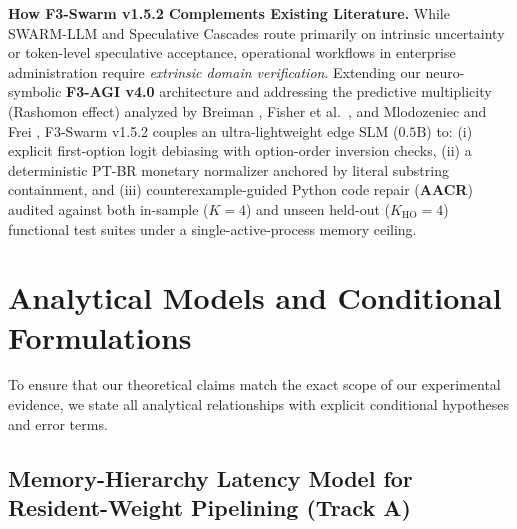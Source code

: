 \documentclass[10pt,a4paper]{article}
\begin{document}
\textbf{How F3-Swarm v1.5.2 Complements Existing Literature.}
While SWARM-LLM \cite{dahshan2026swarmllm} and Speculative Cascades \cite{narasimhan2024cascades} route primarily on intrinsic uncertainty or token-level speculative acceptance, operational workflows in enterprise administration require \emph{extrinsic domain verification}. Extending our neuro-symbolic \textbf{F3-AGI v4.0} architecture \cite{oliveira2026f3agi} and addressing the predictive multiplicity (Rashomon effect) analyzed by Breiman \cite{breiman2001statistical}, Fisher et al.\ \cite{fisher2019rashomon}, and Mlodozeniec and Frei \cite{mlodozeniec2026rashomon}, F3-Swarm v1.5.2 couples an ultra-lightweight edge SLM ($0.5\text{B}$) to: (i) explicit first-option logit debiasing with option-order inversion checks, (ii) a deterministic PT-BR monetary normalizer anchored by literal substring containment, and (iii) counterexample-guided Python code repair (\textbf{AACR}) audited against both in-sample ($K=4$) and unseen held-out ($K_{\text{HO}}=4$) functional test suites under a single-active-process memory ceiling.

\section{Analytical Models and Conditional Formulations}
\label{sec:theory}

To ensure that our theoretical claims match the exact scope of our experimental evidence, we state all analytical relationships with explicit conditional hypotheses and error terms.

\subsection{Memory-Hierarchy Latency Model for Resident-Weight Pipelining (Track A)}
\label{sec:math_memory}
\end{document}
